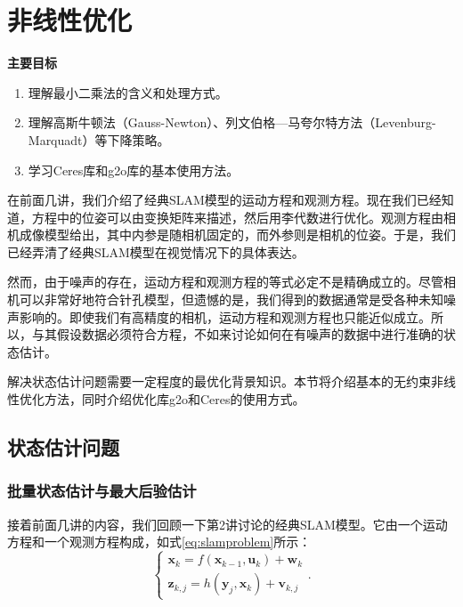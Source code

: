 \chapter{非线性优化}

\begin{mdframed}  
	\textbf{主要目标}
	\begin{enumerate}[labelindent=0em,leftmargin=1.5em]
		\item 理解最小二乘法的含义和处理方式。
		\item 理解高斯牛顿法（Gauss-Newton）、列文伯格—马夸尔特方法（Levenburg-\\Marquadt）等下降策略。
		\item 学习Ceres库和g2o库的基本使用方法。
	\end{enumerate}
\end{mdframed} 

在前面几讲，我们介绍了经典SLAM模型的运动方程和观测方程。现在我们已经知道，方程中的位姿可以由变换矩阵来描述，然后用李代数进行优化。观测方程由相机成像模型给出，其中内参是随相机固定的，而外参则是相机的位姿。于是，我们已经弄清了经典SLAM模型在视觉情况下的具体表达。

然而，由于噪声的存在，运动方程和观测方程的等式必定不是精确成立的。尽管相机可以非常好地符合针孔模型，但遗憾的是，我们得到的数据通常是受各种未知噪声影响的。即使我们有高精度的相机，运动方程和观测方程也只能近似成立。所以，与其假设数据必须符合方程，不如来讨论如何在有噪声的数据中进行准确的状态估计。

解决状态估计问题需要一定程度的最优化背景知识。本节将介绍基本的无约束非线性优化方法，同时介绍优化库g2o和Ceres的使用方式。

\newpage


\newpage 
\section{状态估计问题}
\subsection{批量状态估计与最大后验估计}
接着前面几讲的内容，我们回顾一下第2讲讨论的经典SLAM模型。它由一个运动方程和一个观测方程构成，如式\eqref{eq:slamproblem}所示：
\begin{equation}
\left\{ \begin{array}{l}
{\bm{x}_k} = f\left( {{\bm{x}_{k - 1}},{\bm{u}_k}} \right) + \bm{w}_k\\
{\bm{z}_{k,j}} = h\left( {{ \bm{y}_j},{ \bm{x}_k}}  \right)+ \bm{v}_{k,j}
\end{array} \right. .
\end{equation}

